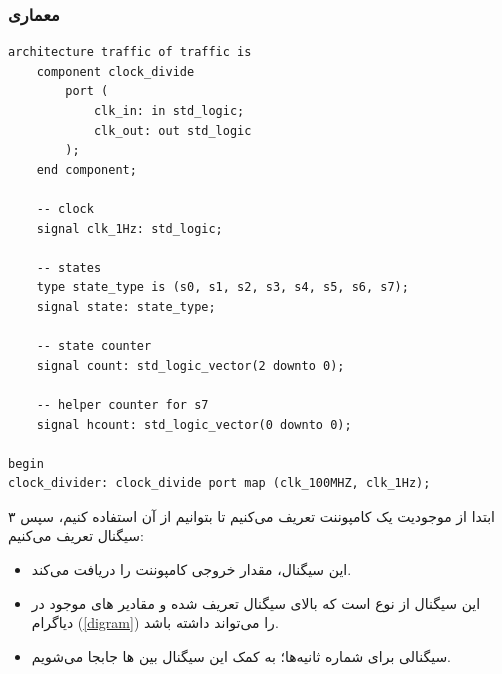 \documentclass[dvipsnames, svgnames, x11names, a4paper, 11pt]{article}
\begin{document}
\subsubsection{معماری}
\begin{latin}
\begin{lstlisting}[firstnumber=12]
architecture traffic of traffic is
    component clock_divide
        port (
            clk_in: in std_logic;
            clk_out: out std_logic
        );
	end component;

    -- clock
    signal clk_1Hz: std_logic;

    -- states
    type state_type is (s0, s1, s2, s3, s4, s5, s6, s7);
    signal state: state_type;

    -- state counter
    signal count: std_logic_vector(2 downto 0);

    -- helper counter for s7
    signal hcount: std_logic_vector(0 downto 0);

begin
clock_divider: clock_divide port map (clk_100MHZ, clk_1Hz);
\end{lstlisting}
\end{latin}
ابتدا
از موجودیت 
یک کامپوننت تعریف می‌کنیم تا بتوانیم از آن استفاده کنیم، سپس ۳ سیگنال تعریف می‌کنیم:
\begin{itemize}
\item {}

این سیگنال، مقدار خروجی کامپوننت 
را دریافت می‌کند.

\item {}

این سیگنال از نوع 
است که بالای سیگنال تعریف شده و مقادیر 
های
موجود در دیاگرام (\ref{digram}) را می‌تواند داشته باشد.

\item {}

سیگنالی برای شماره ثانیه‌ها؛ به کمک این سیگنال بین 
ها
جابجا می‌شویم.
\end{itemize}

\newpage
\end{document}
